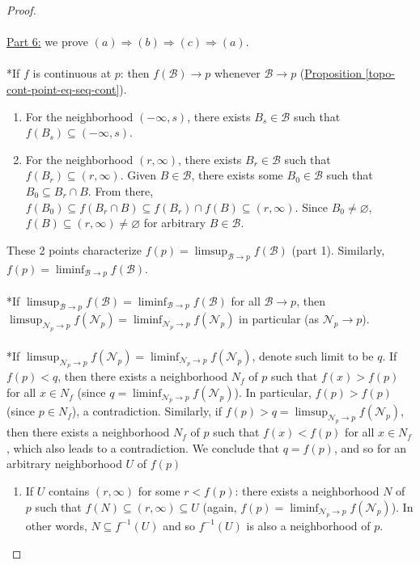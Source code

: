 \documentclass{treatise}
\begin{document}
\begin{proof}
\\
\\
\underline{Part 6:} we prove $(a) \Rightarrow (b) \Rightarrow (c) \Rightarrow (a)$.
\\
\\
*If $f$ is continuous at $p$: then $f(\mathcal{B}) \to p$ whenever $\mathcal{B} \to p$ (\hyperref[topo-cont-point-eq-seq-cont]{Proposition \ref*{topo-cont-point-eq-seq-cont}}).
\begin{enumerate}
    \item For the neighborhood $(-\infty, s)$, there exists $B_s \in \mathcal{B}$ such that $f(B_s) \subseteq (-\infty, s)$.
    \item For the neighborhood $(r, \infty)$, there exists $B_r \in \mathcal{B}$ such that $f(B_r) \subseteq (r, \infty)$. Given $B \in \mathcal{B}$, there exists some $B_0 \in \mathcal{B}$ such that $B_0 \subseteq B_r \cap B$. From there, $f(B_0) \subseteq f(B_r \cap B) \subseteq f(B_r) \cap f(B) \subseteq (r, \infty)$. Since $B_0 \neq \varnothing$, $f(B) \subseteq (r, \infty) \neq \varnothing$ for arbitrary $B \in \mathcal{B}$.
\end{enumerate}
These 2 points characterize $f(p) = \limsup_{\mathcal{B} \to p} f(\mathcal{B})$ (part 1). Similarly, $f(p) = \liminf_{\mathcal{B} \to p} f(\mathcal{B})$.
\\
\\
*If $\limsup_{\mathcal{B} \to p} f(\mathcal{B}) = \liminf_{\mathcal{B} \to p} f(\mathcal{B})$ for all $\mathcal{B} \to p$, then $\limsup_{\mathcal{N}_p \to p} f(\mathcal{N}_p) = \liminf_{\mathcal{N}_p \to p} f(\mathcal{N}_p)$ in particular (as $\mathcal{N}_p \to p$).
\\
\\
*If $\limsup_{\mathcal{N}_p \to p} f(\mathcal{N}_p) = \liminf_{\mathcal{N}_p \to p} f(\mathcal{N}_p)$, denote such limit to be $q$. If $f(p) < q$, then there exists a neighborhood $N_f$ of $p$ such that $f(x) > f(p)$ for all $x \in N_f$ (since $q = \liminf_{\mathcal{N}_p \to p} f(\mathcal{N}_p)$). In particular, $f(p) > f(p)$ (since $p \in N_f$), a contradiction. Similarly, if $f(p) > q = \limsup_{\mathcal{N}_p \to p} f(\mathcal{N}_p)$, then there exists a neighborhood $N_f$ of $p$ such that $f(x) < f(p)$ for all $x \in N_f$, which also leads to a contradiction. We conclude that $q = f(p)$, and so for an arbitrary neighborhood $U$ of $f(p)$
\begin{enumerate}
    \item If $U$ contains $(r, \infty)$ for some $r < f(p)$: there exists a neighborhood $N$ of $p$ such that $f(N) \subseteq (r, \infty) \subseteq U$ (again, $f(p) = \liminf_{\mathcal{N}_p \to p} f(\mathcal{N}_p)$). In other words, $N \subseteq f^{-1}(U)$ and so $f^{-1}(U)$ is also a neighborhood of $p$.

\end{enumerate}
\end{proof}
\end{document}
